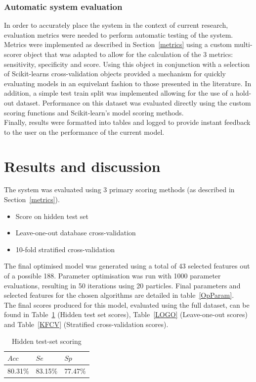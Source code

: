 \documentclass[titlepage, 12pt]{scrartcl} \usepackage{enumitem}
\begin{document}
\subsubsection{Automatic system evaluation}
In order to accurately place the system in the context of current research,
evaluation metrics were needed to perform automatic testing of the system.
Metrics were implemented as described in Section~\ref{metrics} using a custom
multi-scorer object that was adapted to allow for the calculation of the 3
metrics: sensitivity, specificity and score. Using this object in conjunction
with a selection of Scikit-learns cross-validation objects provided a mechanism
for quickly evaluating models in an equivelant fashion to those presented in
the literature. In addition, a simple test train split was implemented allowing
for the use of a hold-out dataset. Performance on this dataset was evaluated
directly using the custom scoring functions and Scikit-learn's model scoring
methods.\\
Finally, results were formatted into tables and logged to provide instant
feedback to the user on the performance of the current model.

\section{Results and discussion}\label{Eval}
The system was evaluated using 3 primary scoring methods (as described in
Section~\ref{metrics}).
\begin{itemize}
    \item Score on hidden test set
    \item Leave-one-out database cross-validation
    \item 10-fold stratified cross-validation
\end{itemize}

The final optimised model was generated using a total of 43 selected features
out of a possible 188. Parameter optimisation was run with 1000 parameter
evaluations, resulting in 50 iterations using 20 particles. Final parameters
and selected features 
for the chosen algorithms are detailed in table~\ref{OpParam}.\\
The final scores produced for this model, evaluated using the full dataset, can
be found in Table~\ref{TestSet} (Hidden test set scores), Table~\ref{LOGO}
(Leave-one-out scores) and
Table~\ref{KFCV} (Stratified cross-validation scores).

\begin{table}[H]
\centering
\caption{Hidden test-set scoring}
\label{TestSet}
\begin{tabular}{@{}lll@{}}
\toprule
$Acc$  & $Se$    & $Sp$    \\ \midrule
80.31\% & 83.15\% & 77.47\% \\ \bottomrule
\end{tabular}
\end{table}
\end{document}
